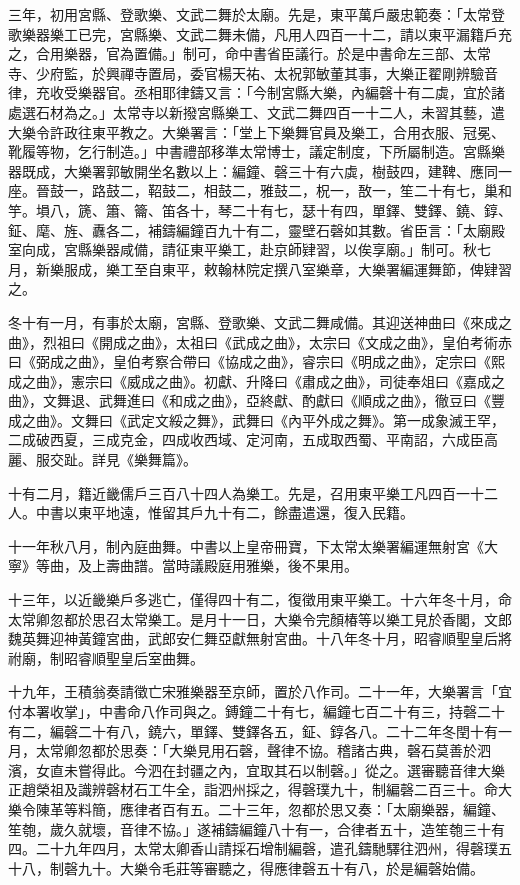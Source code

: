 \begin{pinyinscope}
 三年，初用宮縣、登歌樂、文武二舞於太廟。先是，東平萬戶嚴忠範奏：「太常登歌樂器樂工已完，宮縣樂、文武二舞未備，凡用人四百一十二，請以東平漏籍戶充之，合用樂器，官為置備。」制可，命中書省臣議行。於是中書命左三部、太常寺、少府監，於興禪寺置局，委官楊天祐、太祝郭敏董其事，大樂正翟剛辨驗音律，充收受樂器官。丞相耶律鑄又言：「今制宮縣大樂，內編磬十有二虡，宜於諸處選石材為之。」太常寺以新撥宮縣樂工、文武二舞四百一十二人，未習其藝，遣大樂令許政往東平教之。大樂署言：「堂上下樂舞官員及樂工，合用衣服、冠冕、靴履等物，乞行制造。」中書禮部移準太常博士，議定制度，下所屬制造。宮縣樂器既成，大樂署郭敏開坐名數以上：編鐘、磬三十有六虡，樹鼓四，建鞞、應同一座。晉鼓一，路鼓二，鞀鼓二，相鼓二，雅鼓二，柷一，敔一，笙二十有七，巢和竽。塤八，篪、簫、籥、笛各十，琴二十有七，瑟十有四，單鐸、雙鐸、鐃、錞、鉦、麾、旌、纛各二，補鑄編鐘百九十有二，靈壁石磬如其數。省臣言：「太廟殿室向成，宮縣樂器咸備，請征東平樂工，赴京師肄習，以俟享廟。」制可。秋七月，新樂服成，樂工至自東平，敕翰林院定撰八室樂章，大樂署編運舞節，俾肄習之。



 冬十有一月，有事於太廟，宮縣、登歌樂、文武二舞咸備。其迎送神曲曰《來成之曲》，烈祖曰《開成之曲》，太祖曰《武成之曲》，太宗曰《文成之曲》，皇伯考術赤曰《弼成之曲》，皇伯考察合帶曰《協成之曲》，睿宗曰《明成之曲》，定宗曰《熙成之曲》，憲宗曰《威成之曲》。初獻、升降曰《肅成之曲》，司徒奉俎曰《嘉成之曲》，文舞退、武舞進曰《和成之曲》，亞終獻、酌獻曰《順成之曲》，徹豆曰《豐成之曲》。文舞曰《武定文綏之舞》，武舞曰《內平外成之舞》。第一成象滅王罕，二成破西夏，三成克金，四成收西域、定河南，五成取西蜀、平南詔，六成臣高麗、服交趾。詳見《樂舞篇》。



 十有二月，籍近畿儒戶三百八十四人為樂工。先是，召用東平樂工凡四百一十二人。中書以東平地遠，惟留其戶九十有二，餘盡遣還，復入民籍。



 十一年秋八月，制內庭曲舞。中書以上皇帝冊寶，下太常太樂署編運無射宮《大寧》等曲，及上壽曲譜。當時議殿庭用雅樂，後不果用。



 十三年，以近畿樂戶多逃亡，僅得四十有二，復徵用東平樂工。十六年冬十月，命太常卿忽都於思召太常樂工。是月十一日，大樂令完顏椿等以樂工見於香閣，文郎魏英舞迎神黃鐘宮曲，武郎安仁舞亞獻無射宮曲。十八年冬十月，昭睿順聖皇后將祔廟，制昭睿順聖皇后室曲舞。



 十九年，王積翁奏請徵亡宋雅樂器至京師，置於八作司。二十一年，大樂署言「宜付本署收掌」，中書命八作司與之。鎛鐘二十有七，編鐘七百二十有三，持磬二十有二，編磬二十有八，鐃六，單鐸、雙鐸各五，鉦、錞各八。二十二年冬閏十有一月，太常卿忽都於思奏：「大樂見用石磬，聲律不協。稽諸古典，磬石莫善於泗濱，女直未嘗得此。今泗在封疆之內，宜取其石以制磬。」從之。選審聽音律大樂正趙榮祖及識辨磬材石工牛全，詣泗州採之，得磬璞九十，制編磬二百三十。命大樂令陳革等料簡，應律者百有五。二十三年，忽都於思又奏：「太廟樂器，編鐘、笙匏，歲久就壞，音律不協。」遂補鑄編鐘八十有一，合律者五十，造笙匏三十有四。二十九年四月，太常太卿香山請採石增制編磬，遣孔鑄馳驛往泗州，得磬璞五十八，制磬九十。大樂令毛莊等審聽之，得應律磬五十有八，於是編磬始備。




\end{pinyinscope}
